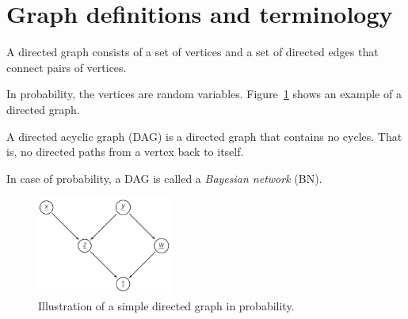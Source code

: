 \section{Graph definitions and terminology}
\begin{definitionBox}
    A directed graph consists of a set of vertices and a set of directed edges that connect pairs of vertices.

    In probability, the vertices are random variables. Figure~\ref{fig:simple_dag} shows an example of a directed graph.
\end{definitionBox}
\begin{definitionBox}
    \label{def:directed acyclic graph}
    A directed acyclic graph (DAG) is a directed graph that contains no cycles. That is, no directed paths from a vertex back to itself.

    In case of probability, a DAG is called a \emph{Bayesian network} (BN).
\end{definitionBox}

\begin{figure}[h]
    \centering
    \includegraphics[width=0.4\textwidth]{figs/Graphs/simple_dag.PNG}    
    \caption{Illustration of a simple directed graph in probability.}
    \label{fig:simple_dag}
\end{figure}

